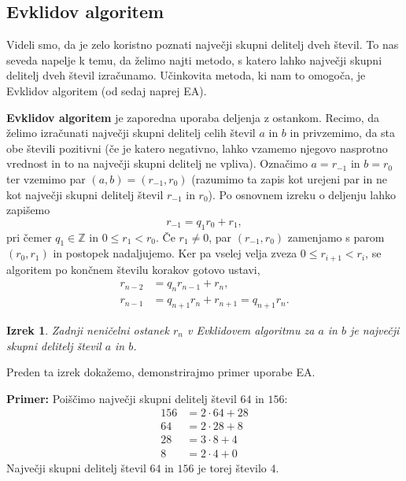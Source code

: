 \documentclass[12pt, a4paper]{article}
\newtheorem{izr}{Izrek}
\newenvironment{prim}[1][]{\par\medskip\noindent \textbf{Primer: }}{\medskip}
\begin{document}
\subsection{Evklidov algoritem}

Videli smo, da je zelo koristno poznati največji skupni delitelj dveh števil. To nas seveda napelje k temu, da želimo najti metodo, s katero lahko največji skupni delitelj dveh števil izračunamo. Učinkovita metoda, ki nam to omogoča, je Evklidov algoritem (od sedaj naprej EA).

\textbf{Evklidov algoritem} je zaporedna uporaba deljenja z ostankom. Recimo, da želimo izračunati največji skupni delitelj celih števil $a$ in $b$ in privzemimo, da sta obe števili pozitivni (če je katero negativno, lahko vzamemo njegovo nasprotno vrednost in to na največji skupni delitelj ne vpliva). Označimo $a=r_{-1}$ in $b=r_0$ ter vzemimo par $(a,b)=(r_{-1}, r_0)$ (razumimo ta zapis kot urejeni par in ne kot največji skupni delitelj števil $r_{-1}$ in $r_0$). Po osnovnem izreku o deljenju lahko zapišemo
$$r_{-1} = q_1 r_0 + r_1,$$
pri čemer $q_1\in \mathbb{Z}$ in $0\leq r_1 < r_0$. Če $r_1 \neq 0$, par $(r_{-1}, r_0)$ zamenjamo s parom $(r_0, r_1)$ in postopek nadaljujemo. Ker pa vselej velja zveza $0\leq r_{i+1} < r_i$, se algoritem po končnem številu korakov gotovo ustavi,
\begin{align*}
r_{n-2} &= q_n r_{n-1} + r_n, \\
r_{n-1} &= q_{n+1} r_n + r_{n+1}=  q_{n+1} r_n.
\end{align*}

\begin{izr}
Zadnji neničelni ostanek $r_n$ v Evklidovem algoritmu za $a$ in $b$ je največji skupni delitelj števil $a$ in $b$.
\end{izr}

Preden ta izrek dokažemo, demonstrirajmo primer uporabe EA.

\begin{prim}
Poiščimo največji skupni delitelj števil $64$ in $156$:
\begin{align*}
156 &= 2\cdot 64 + 28 \\
64 &= 2\cdot 28 + 8 \\
28 &= 3\cdot 8 + 4 \\
8 &= 2\cdot 4 + 0
\end{align*} 
Največji skupni delitelj števil $64$ in $156$ je torej število $4$.
\end{prim}
\end{document}
